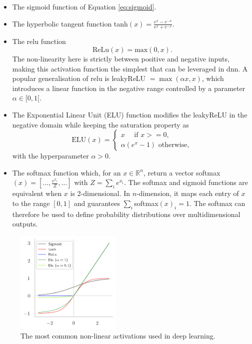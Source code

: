 \begin{itemize}
    \item The sigmoid function of Equation \ref{eq:sigmoid}.
    \item The hyperbolic tangent function tanh$(x) = \frac{e^x - e^{-x}}{e^x + e^{-x}}$.
    \item The \gls{relu} function\cite{agarap2019deep}
    \begin{equation}\label{eq:relu}
        \text{ReLu}(x) = \text{max}(0, x).
    \end{equation}
    The non-linearity here is strictly between positive and negative inputs, making this activation function the simplest that can be leveraged in \gls{dnn}. A popular generalisation of \gls{relu} is leakyReLU $= \max(\alpha x, x)$, which introduces a linear function in the negative range controlled by a parameter $\alpha \in [0, 1[$. 
    \item The Exponential Linear Unit (ELU) function modifies the leakyReLU in the negative domain while keeping the saturation property as
    \begin{equation}\label{eq:elu}
        \text{ELU}(x) = 
        \begin{cases}
            x \quad \text{ if } x >= 0, \\
            \alpha (e^x - 1) \text{ otherwise},
        \end{cases}
    \end{equation}
    with the hyperparameter $\alpha > 0$.
    \item The softmax function which, for an $x \in \mathbb{R}^n$, return a vector softmax$(x) = [..., \frac{e^{x_i}}{Z}, ...]$ with $Z = \sum_i e^{x_i}$. The softmax and sigmoid functions are equivalent when $x$ is 2-dimensional. In $n$-dimension, it maps each entry of $x$ to the range $[0, 1]$ and guarantees $\sum_i $softmax$(x)_i = 1$. The softmax can therefore be used to define probability distributions over multidimensional outputs.
\end{itemize}
\begin{figure}
    \begin{center}
        \includegraphics[width=0.45\textwidth]{Images/ML/activations.png}
        \caption{The most common non-linear activations used in deep learning.} 
        \label{fig:commonAct}
    \end{center}
\end{figure}

